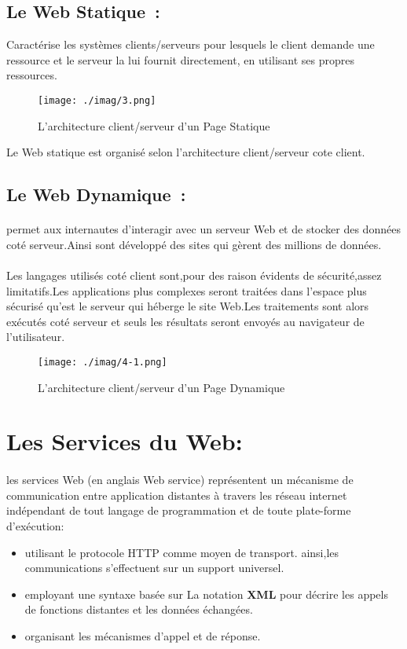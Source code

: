 \subsection{Le Web Statique :}
Caractérise les systèmes clients/serveurs pour lesquels le client demande une ressource et le serveur la lui fournit directement, en utilisant ses propres ressources.

\begin{figure}[h]
	\centering
	\texttt{[image: ./imag/3.png]}
	\caption{L’architecture client/serveur d'un Page Statique}
\end{figure}
Le Web statique est organisé selon l’architecture client/serveur cote client.
\subsection{Le Web Dynamique :}
\paragraph{}
permet aux internautes d'interagir avec un serveur Web et de stocker des données coté serveur.Ainsi sont développé des sites qui gèrent des millions de données.
\paragraph{}
Les langages utilisés coté client sont,pour des raison évidents de sécurité,assez limitatifs.Les applications plus complexes seront traitées dans l'espace plus sécurisé qu'est le serveur qui héberge le site Web.Les traitements sont alors exécutés coté serveur et seuls les résultats seront envoyés au navigateur de l'utilisateur.
\begin{figure}[h]
	\centering
	\texttt{[image: ./imag/4-1.png]}
	\caption{L’architecture client/serveur d'un Page Dynamique}
\end{figure}

\section{Les Services du Web:}
\paragraph{}
les services Web (en anglais Web service) représentent un mécanisme de communication entre application distantes à travers les réseau internet indépendant de tout langage de programmation et de toute plate-forme d'exécution:
\begin{itemize}
	\item utilisant le protocole HTTP comme moyen de transport. ainsi,les communications s'effectuent sur un support universel.
	\item employant une syntaxe basée sur La notation \textbf{XML} pour décrire les appels de fonctions distantes et les données échangées.
	\item organisant les mécanismes d'appel et de réponse.
\end{itemize}
